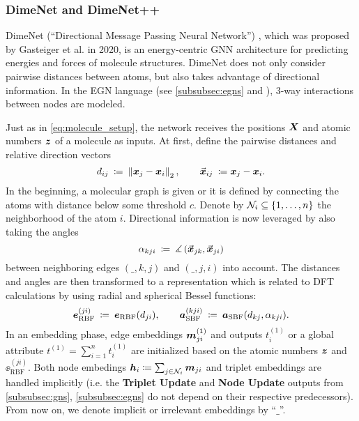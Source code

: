 \subsubsection{DimeNet and DimeNet++}
\label{subsubsec:dimenet}

DimeNet (\enquote{Directional Message Passing Neural Network}) 
\cite{DBLP:journals/corr/abs-2003-03123}, which was proposed by Gasteiger et al. 
in 2020, is an energy-centric GNN architecture for predicting energies and forces 
of molecule structures. DimeNet does not only consider pairwise distances between atoms, 
but also takes advantage of directional information. In the EGN 
language (see \ref{subsubsec:egns} and \cite{https://doi.org/10.48550/arxiv.2203.09697}),
3-way interactions between nodes are modeled.

Just as in \eqref{eq:molecule_setup}, the network receives the positions $\boldsymbol{X}$
and atomic numbers $\boldsymbol{z}$ of a molecule as inputs. 
At first, define the pairwise distances and relative direction vectors
\[
    d_{ij} \: \coloneqq \: \left\lVert\boldsymbol{x}_j - \boldsymbol{x}_i\right\rVert_2, 
    \qquad \vec{\boldsymbol{x}}_{ij} \: \coloneqq \boldsymbol{x}_j - \boldsymbol{x}_i \text{.}
\]
In the beginning, a molecular graph is given or it is defined by connecting the atoms with distance 
below some threshold $c$. Denote by $\mathcal{N}_i \subseteq \left\{1, \dots, n\right\}$ the 
neighborhood of the atom $i$.
Directional information is now leveraged by also 
taking the angles
\[
    \alpha_{kji} \: \coloneqq \: \measuredangle\left( \vec{\boldsymbol{x}}_{jk}, \vec{\boldsymbol{x}}_{ji} \right)
\]
between neighboring edges $(\_,k,j)$ and $(\_,j,i)$ into account. 
The distances and angles are then transformed to a representation which is related
to DFT calculations \cite[Section 5]{DBLP:journals/corr/abs-2003-03123}
by using radial and spherical Bessel functions:
\[
    \boldsymbol{e}_{\text{RBF}}^{(ji)} \: \coloneqq \: \boldsymbol{e}_{\text{RBF}}(d_{ji}), 
    \qquad \boldsymbol{a}_{\text{SBF}}^{(kji)} \: \coloneqq \: \boldsymbol{a}_{\text{SBF}}(d_{kj}, \alpha_{kji})
    \text{.}
\]
In an embedding phase, edge embeddings $\boldsymbol{m}_{ji}^{(1)}$ and outputs
$t_{i}^{(1)}$ or a global attribute $t^{(1)} = \sum_{i=1}^n t_i^{(1)}$ are initialized based
on the atomic numbers $\boldsymbol{z}$ and $\ee_{\text{RBF}}^{(ji)}$. Both node embedings 
$\boldsymbol{h}_i \coloneqq \sum_{j \in \mathcal{N}_i} \boldsymbol{m}_{ji}$ and triplet embeddings are handled
implicitly (i.e. the \textbf{Triplet Update} and \textbf{Node Update} outputs from 
\ref{subsubsec:gns}, \ref{subsubsec:egns} do not depend on their respective predecessors).
From now on, we denote implicit or irrelevant embeddings by \enquote{$\_$}.

